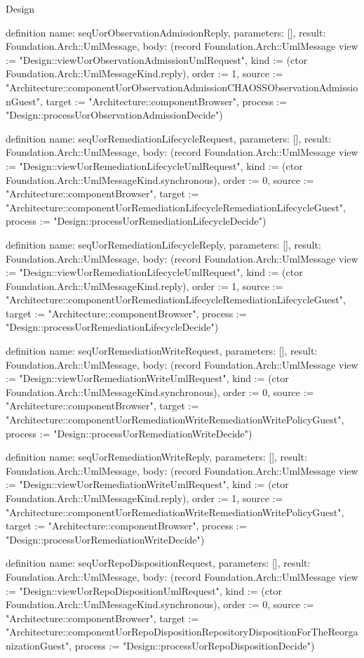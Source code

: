 \begin{lexlean}{Design}
\begin{semanticmodule}
definition{
  name: seqUorObservationAdmissionReply,
  parameters: [],
  result: Foundation.Arch::UmlMessage,
  body: (record Foundation.Arch::UmlMessage {view := "Design::viewUorObservationAdmissionUmlRequest", kind := (ctor Foundation.Arch::UmlMessageKind.reply), order := 1, source := "Architecture::componentUorObservationAdmissionCHAOSSObservationAdmissionGuest", target := "Architecture::componentBrowser", process := "Design::processUorObservationAdmissionDecide"})
}

definition{
  name: seqUorRemediationLifecycleRequest,
  parameters: [],
  result: Foundation.Arch::UmlMessage,
  body: (record Foundation.Arch::UmlMessage {view := "Design::viewUorRemediationLifecycleUmlRequest", kind := (ctor Foundation.Arch::UmlMessageKind.synchronous), order := 0, source := "Architecture::componentBrowser", target := "Architecture::componentUorRemediationLifecycleRemediationLifecycleGuest", process := "Design::processUorRemediationLifecycleDecide"})
}

definition{
  name: seqUorRemediationLifecycleReply,
  parameters: [],
  result: Foundation.Arch::UmlMessage,
  body: (record Foundation.Arch::UmlMessage {view := "Design::viewUorRemediationLifecycleUmlRequest", kind := (ctor Foundation.Arch::UmlMessageKind.reply), order := 1, source := "Architecture::componentUorRemediationLifecycleRemediationLifecycleGuest", target := "Architecture::componentBrowser", process := "Design::processUorRemediationLifecycleDecide"})
}

definition{
  name: seqUorRemediationWriteRequest,
  parameters: [],
  result: Foundation.Arch::UmlMessage,
  body: (record Foundation.Arch::UmlMessage {view := "Design::viewUorRemediationWriteUmlRequest", kind := (ctor Foundation.Arch::UmlMessageKind.synchronous), order := 0, source := "Architecture::componentBrowser", target := "Architecture::componentUorRemediationWriteRemediationWritePolicyGuest", process := "Design::processUorRemediationWriteDecide"})
}

definition{
  name: seqUorRemediationWriteReply,
  parameters: [],
  result: Foundation.Arch::UmlMessage,
  body: (record Foundation.Arch::UmlMessage {view := "Design::viewUorRemediationWriteUmlRequest", kind := (ctor Foundation.Arch::UmlMessageKind.reply), order := 1, source := "Architecture::componentUorRemediationWriteRemediationWritePolicyGuest", target := "Architecture::componentBrowser", process := "Design::processUorRemediationWriteDecide"})
}

definition{
  name: seqUorRepoDispositionRequest,
  parameters: [],
  result: Foundation.Arch::UmlMessage,
  body: (record Foundation.Arch::UmlMessage {view := "Design::viewUorRepoDispositionUmlRequest", kind := (ctor Foundation.Arch::UmlMessageKind.synchronous), order := 0, source := "Architecture::componentBrowser", target := "Architecture::componentUorRepoDispositionRepositoryDispositionForTheReorganizationGuest", process := "Design::processUorRepoDispositionDecide"})
}


\end{semanticmodule}
\end{lexlean}
